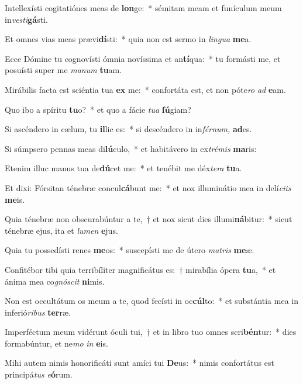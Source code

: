 \item Intellexísti cogitatiónes meas de \textbf{lon}ge:~* sémitam meam et funículum meum in\textit{vesti}\textbf{gá}sti.
\item Et omnes vias meas prævi\textbf{dí}sti:~* quia non est sermo in \textit{lingua} \textbf{me}a.
\item Ecce Dómine tu cognovísti ómnia novíssima  et an\textbf{tí}qua:~* tu formásti me, et posuísti super me \textit{manum} \textbf{tu}am.
\item Mirábilis facta est sciéntia tua \textbf{ex} me:~* confortáta est, et non póte\textit{ro} \textit{ad} \textbf{e}am.
\item Quo ibo a spíritu \textbf{tu}o?~* et quo a fácie \textit{tua} \textbf{fú}giam?
\item Si ascéndero in cælum, tu \textbf{il}lic es:~* si descéndero in in\textit{férnum,} \textbf{ad}es.
\item Si súmpsero pennas meas di\textbf{lú}culo,~* et habitávero in ex\hspace*{0.02em}\textit{trémis} \textbf{ma}ris:
\item Etenim illuc manus tua de\textbf{dú}cet me:~* et tenébit me déx\hspace*{0.02em}\textit{tera} \textbf{tu}a.
\item Et dixi: Fórsitan ténebræ concul\textbf{cá}bunt me:~* et nox illuminátio mea in delí\hspace*{0.02em}\textit{ciis} \textbf{me}is.
\item Quia ténebræ non obscurabúntur a te,~† et nox sicut dies illumi\textbf{ná}bitur:~* sicut ténebræ ejus, ita et \textit{lumen} \textbf{e}jus.
\item Quia tu possedísti renes \textbf{me}os:~* suscepísti me de útero \textit{matris} \textbf{me}æ.
\item Confitébor tibi quia terribíliter magnificátus es:~† mirabília ópera \textbf{tu}a,~* et ánima mea co\textit{gnóscit} \textbf{ni}mis.
\item Non est occultátum os meum a te, quod fecísti in oc\textbf{cúl}to:~* et substántia mea in inferió\textit{ribus} \textbf{ter}ræ.
\item Imperféctum meum vidérunt óculi tui,~† et in libro tuo o\-mnes scri\textbf{bén}tur:~* dies formabúntur, et ne\textit{mo} \textit{in} \textbf{e}is.
\item Mihi autem nimis honorificáti sunt amíci tui \textbf{De}us:~* nimis confortátus est principá\hspace*{0.02em}\textit{tus} \textit{e}\textbf{ó}rum.
